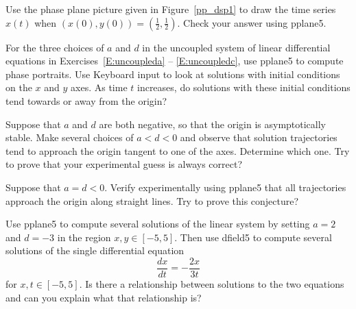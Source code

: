\begin{exercise} \label{c3.4.3}
Use the phase plane picture given in Figure~\ref{pp_dsp1} to
draw the time series $x(t)$ when $(x(0),y(0)) =
(\frac{1}{2},\frac{1}{2})$.  Check your answer using {\sf
pplane5}.
\end{exercise}

\CEXER


\begin{exercise} \label{c3.4.4}
For the three choices of $a$ and $d$ in the uncoupled system of
linear differential equations in Exercises~\ref{E:uncoupleda} -- 
\ref{E:uncoupledc}, use {\sf pplane5}
to compute phase portraits.  Use {\sf Keyboard input} to look at
solutions with initial conditions on the $x$ and $y$ axes.  As time
$t$ increases, do solutions with these initial conditions tend towards 
or away from the origin?
\end{exercise}

\begin{exercise} \label{c3.4.5}
Suppose that $a$ and $d$ are both negative, so that the origin
is asymptotically stable.  Make several choices of $a<d<0$ and
observe that solution trajectories tend to approach the origin
tangent to one of the axes.  Determine which one.  Try to prove
that your experimental guess is always correct?
\end{exercise}

\begin{exercise} \label{c3.4.6}
Suppose that $a=d<0$.  Verify experimentally using {\sf pplane5}
that all trajectories approach the origin along straight lines.
Try to prove this conjecture?
\end{exercise}

\begin{exercise} \label{c3.4.7}
Use {\sf pplane5} to compute several solutions of the linear system by
setting $a=2$ and $d=-3$ in the region $x,y\in[-5,5]$.  Then use
{\sf dfield5} to compute several solutions of the single differential
equation
\[
\frac{dx}{dt} = -\frac{2x}{3t}
\]
for $x,t\in[-5,5]$.  Is there a relationship between solutions to the
two equations and can you explain what that relationship is?
\end{exercise}



  \label{s:3.5}



